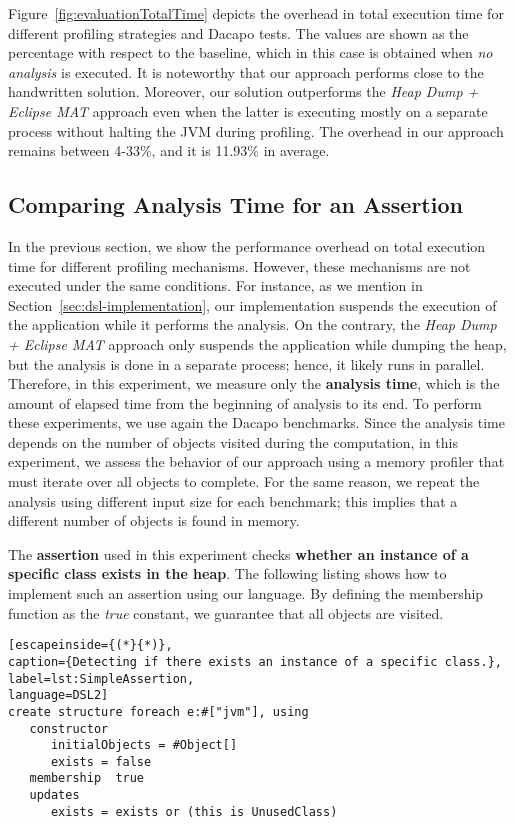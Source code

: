 Figure~\ref{fig:evaluationTotalTime} depicts the overhead in total execution time for different profiling strategies and Dacapo tests.
The values are shown as the percentage with respect to the baseline, which in this case is obtained when \textit{no analysis} is executed.
It is noteworthy that our approach performs close to the handwritten solution.
Moreover, our solution outperforms the \textit{Heap Dump + Eclipse MAT} approach even when the latter is executing mostly on a separate process without halting the JVM during profiling.
The overhead in our approach remains between 4-33\%, and it is 11.93\% in average.

\subsection{Comparing Analysis Time for an Assertion}

In the previous section, we show the performance overhead on total execution time for different profiling mechanisms.
However, these mechanisms are not executed under the same conditions.
For instance, as we mention in Section~\ref{sec:dsl-implementation}, our implementation suspends the execution of the application while it performs the analysis.
On the contrary, the \textit{Heap Dump + Eclipse MAT} approach only suspends the application while dumping the heap, but the analysis is done in a separate process; hence, it likely runs in parallel.
Therefore, in this experiment, we measure only the \textbf{analysis time}, which is the amount of elapsed time from the beginning of analysis to its end.
To perform these experiments, we use again the Dacapo benchmarks.
Since the analysis time depends on the number of objects visited during the computation, in this experiment, we assess the behavior of our approach using a memory profiler that must iterate over all objects to complete.
For the same reason, we repeat the analysis using different input size for each benchmark; this implies that a different number of objects is found in memory.

The \textbf{assertion} used in this experiment checks \textbf{whether an instance of a specific class exists in the heap}.
The following listing shows how to implement such an assertion using our language.
By defining the membership function as the \textit{true} constant, we guarantee that all objects are visited.

\begin{lstlisting}[escapeinside={(*}{*)},
caption={Detecting if there exists an instance of a specific class.}, 
label=lst:SimpleAssertion,
language=DSL2]
create structure foreach e:#["jvm"], using
   constructor
      initialObjects = #Object[]
      exists = false
   membership  true
   updates
      exists = exists or (this is UnusedClass)
\end{lstlisting}

